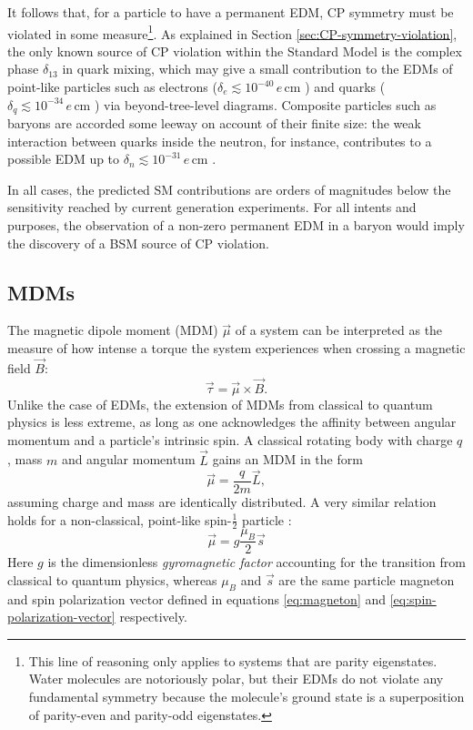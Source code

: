 It follows that, for a particle to have a permanent EDM, CP symmetry must be violated in some measure\footnote{This line of reasoning only applies to systems that are parity eigenstates. Water molecules are notoriously polar, but their EDMs do not violate any fundamental symmetry because the molecule's ground state is a superposition of parity-even and parity-odd eigenstates.}.
As explained in Section \ref{sec:CP-symmetry-violation}, the only known source of CP violation within the Standard Model is the complex phase $\delta_{13}$ in quark mixing, which may give a small contribution to the EDMs of point-like particles such as electrons ($\delta_e \lesssim {10}^{-40}\,e\,\text{cm}$ \cite{electronEDM}) and quarks ($\delta_q \lesssim {10}^{-34} \,e\,\text{cm}$ \cite{quarkEDM}) via beyond-tree-level diagrams. Composite particles such as baryons are accorded some leeway on account of their finite size:
the weak interaction between quarks inside the neutron, for instance, contributes to a possible EDM up to $\delta_n \lesssim {10}^{-31}\,e\,\text{cm}$ \cite{neutronEDM}.

In all cases, the predicted SM contributions are orders of magnitudes below the sensitivity reached by current generation experiments.
For all intents and purposes, the observation of a non-zero permanent EDM in a baryon would imply the discovery of a BSM source of CP violation.

\subsection{MDMs}
The magnetic dipole moment (MDM) $\vec{\mu}$ of a system can be interpreted as the measure of how intense a torque the system experiences when crossing a magnetic field $\vec{B}$:
\begin{equation}
\vec{\tau} = \vec{\mu} \times \vec{B}.
\end{equation}
Unlike the case of EDMs, the extension of MDMs from classical to quantum physics is less extreme, as long as one acknowledges the affinity between angular momentum and a particle's intrinsic spin.
A classical rotating body with charge $q$, mass $m$ and angular momentum $\vec{L}$ gains an MDM in the form
\begin{equation}
	\vec{\mu} = \frac{q}{2m} \vec{L},
\end{equation}
assuming charge and mass are identically distributed.
A very similar relation holds for a non-classical, point-like spin-$\frac{1}{2}$ particle \cite{searchNewPhysics}:
\begin{equation}
	\vec{\mu} = g \frac{\mu_B}{2} \vec{s} 
\end{equation}
Here $g$ is the dimensionless \textit{gyromagnetic factor} accounting for the transition from classical to quantum physics, whereas $\mu_B$ and $\vec{s}$ are the same particle magneton and spin polarization vector defined in equations \eqref{eq:magneton} and \eqref{eq:spin-polarization-vector} respectively.

